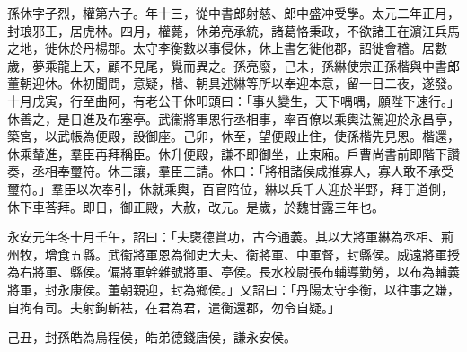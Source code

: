 \begin{pinyinscope}
 
 
 孫休字子烈，權第六子。年十三，從中書郎射慈、郎中盛冲受學。太元二年正月，封琅邪王，居虎林。四月，權薨，休弟亮承統，諸葛恪秉政，不欲諸王在濵江兵馬之地，徙休於丹楊郡。太守李衡數以事侵休，休上書乞徙他郡，詔徙會稽。居數歲，夢乘龍上天，顧不見尾，覺而異之。孫亮廢，己未，孫綝使宗正孫楷與中書郎董朝迎休。休初聞問，意疑，楷、朝具述綝等所以奉迎本意，留一日二夜，遂發。十月戊寅，行至曲阿，有老公干休叩頭曰：「事乆變生，天下喁喁，願陛下速行。」休善之，是日進及布塞亭。武衞將軍恩行丞相事，率百僚以乘輿法駕迎於永昌亭，築宮，以武帳為便殿，設御座。己卯，休至，望便殿止住，使孫楷先見恩。楷還，休乘輦進，羣臣再拜稱臣。休升便殿，謙不即御坐，止東廂。戶曹尚書前即階下讚奏，丞相奉璽符。休三讓，羣臣三請。休曰：「將相諸侯咸推寡人，寡人敢不承受璽符。」羣臣以次奉引，休就乘輿，百官陪位，綝以兵千人迎於半野，拜于道側，休下車荅拜。即日，御正殿，大赦，改元。是歲，於魏甘露三年也。
 
 
 
 
 永安元年冬十月壬午，詔曰：「夫襃德賞功，古今通義。其以大將軍綝為丞相、荊州牧，增食五縣。武衞將軍恩為御史大夫、衞將軍、中軍督，封縣侯。威遠將軍授為右將軍、縣侯。偏將軍幹雜號將軍、亭侯。長水校尉張布輔導勤勞，以布為輔義將軍，封永康侯。董朝親迎，封為鄉侯。」又詔曰：「丹陽太守李衡，以往事之嫌，自拘有司。夫射鉤斬袪，在君為君，遣衡還郡，勿令自疑。」
 
 
 己丑，封孫皓為烏程侯，皓弟德錢唐侯，謙永安侯。
 

\end{pinyinscope}
